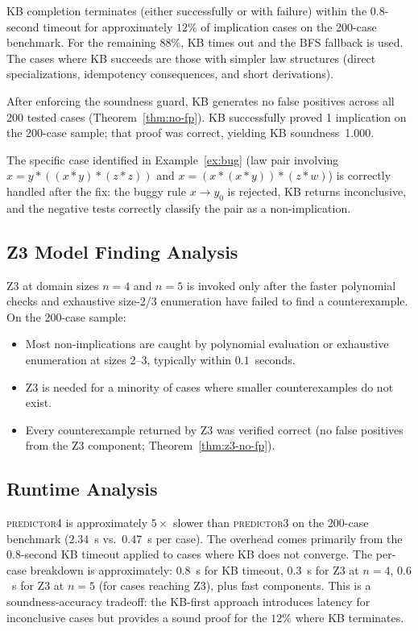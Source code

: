 KB completion terminates (either successfully or with failure) within the 0.8-second
timeout for approximately $12\%$ of implication cases on the 200-case benchmark.
For the remaining $88\%$, KB times out and the BFS fallback is used.  The cases where
KB succeeds are those with simpler law structures (direct specializations, idempotency
consequences, and short derivations).

After enforcing the soundness guard, KB generates no false positives across all 200
tested cases (Theorem~\ref{thm:no-fp}).  KB successfully proved 1 implication on the
200-case sample; that proof was correct, yielding KB soundness~1.000.

The specific case identified in Example~\ref{ex:bug} (law pair involving $x = y * ((x*y)*(z*z))$
and $x = (x*(x*y))*(z*w)$) is correctly handled after the fix: the buggy rule
$x \to y_0$ is rejected, KB returns inconclusive, and the negative tests correctly
classify the pair as a non-implication.

\subsection{Z3 Model Finding Analysis}

Z3 at domain sizes $n = 4$ and $n = 5$ is invoked only after the faster polynomial
checks and exhaustive size-2/3 enumeration have failed to find a counterexample.  On
the 200-case sample:
\begin{itemize}[leftmargin=*,itemsep=1pt,topsep=2pt]
  \item Most non-implications are caught by polynomial evaluation or exhaustive
        enumeration at sizes 2--3, typically within $0.1$~seconds.
  \item Z3 is needed for a minority of cases where smaller counterexamples do not exist.
  \item Every counterexample returned by Z3 was verified correct (no false positives
        from the Z3 component; Theorem~\ref{thm:z3-no-fp}).
\end{itemize}

\subsection{Runtime Analysis}

\textsc{predictor4} is approximately $5\times$ slower than \textsc{predictor3} on
the 200-case benchmark ($2.34$~s vs.\ $0.47$~s per case).  The overhead comes
primarily from the $0.8$-second KB timeout applied to cases where KB does not converge.
The per-case breakdown is approximately: $0.8$~s for KB timeout, $0.3$~s for Z3
at $n=4$, $0.6$~s for Z3 at $n=5$ (for cases reaching Z3), plus fast components.
This is a soundness-accuracy tradeoff: the KB-first approach introduces latency for
inconclusive cases but provides a sound proof for the $12\%$ where KB terminates.
